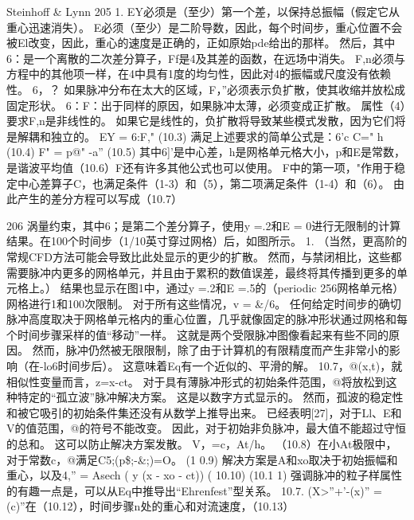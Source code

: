 \documentclass[UTF8,11pt,a4paper,openany,fontset=fandol]{ctexbook}
\begin{document}
Steinhoff \& Lynn 205 1. EY必须是（至少）第一个差，以保持总振幅（假定它从重心迅速消失）。 E必须（至少）是二阶导数，因此，每个时间步，重心位置不会被El改变，因此，重心的速度是正确的，正如原始pde给出的那样。 然后，其中6：是一个离散的二次差分算子，Ff是4及其差的函数，在远场中消失。 F,n必须与方程中的其他项一样，在4中具有1度的均匀性，因此对4的振幅或尺度没有依赖性。 6，？ 如果脉冲分布在太大的区域，F，”必须表示负扩散，使其收缩并放松成固定形状。 6：F：出于同样的原因，如果脉冲太薄，必须变成正扩散。 属性（4）要求F,n是非线性的。 如果它是线性的，负扩散将导致某些模式发散，因为它们将是解耦和独立的。 EY = 6:F," (10.3) 满足上述要求的简单公式是：6'c C=" h (10.4) F" = p@" -a'' (10.5) 其中6]'是中心差，h是网格单元格大小，p和E是常数，是谐波平均值（10.6）F还有许多其他公式也可以使用。 F中的第一项，"作用于稳定中心差算子C，也满足条件（1-3）和（5），第二项满足条件（1-4）和（6）。 由此产生的差分方程可以写成（10.7）

206 涡量约束，其中6；是第二个差分算子，使用y =.2和E = 0进行无限制的计算结果。在100个时间步（1/10英寸穿过网格）后，如图所示。 1. （当然，更高阶的常规CFD方法可能会导致比此处显示的更少的扩散。 然而，与禁闭相比，这些都需要脉冲内更多的网格单元，并且由于累积的数值误差，最终将其传播到更多的单元格上。） 结果也显示在图1中，通过y =.2和E =.5的（periodic 256网格单元格）网格进行1和100次限制。 对于所有这些情况，v = \&/6。 任何给定时间步的确切脉冲高度取决于网格单元格内的重心位置，几乎就像固定的脉冲形状通过网格和每个时间步骤采样的值“移动”一样。 这就是两个受限脉冲图像看起来有些不同的原因。 然而，脉冲仍然被无限限制，除了由于计算机的有限精度而产生非常小的影响（在-lo6时间步后）。 这意味着Eq有一个近似的、平滑的解。 10.7，@(x,t)，就相似性变量而言，z=x-ct。 对于具有薄脉冲形式的初始条件范围，@将放松到这种特定的“孤立波”脉冲解决方案。 这是以数字方式显示的。 然而，孤波的稳定性和被它吸引的初始条件集还没有从数学上推导出来。 已经表明[27]，对于Ll、E和V的值范围，@的符号不能改变。 因此，对于初始非负脉冲，最大值不能超过守恒的总和。 这可以防止解决方案发散。 V，=c，At/h。 （10.8）在小At极限中，对于常数c，@满足C5;(p\$;-\&;)=O。 (1 0.9) 解决方案是A和xo取决于初始振幅和重心，以及4,” = Asech ( y (x - xo - ct)) ( 10.10) (10.1 1) 强调脉冲的粒子样属性的有趣一点是，可以从Eq中推导出“Ehrenfest”型关系。 10.7. (X>”+'-(x)” =(c)”在（10.12），时间步骤n处的重心和对流速度，（10.13）
\end{document}
